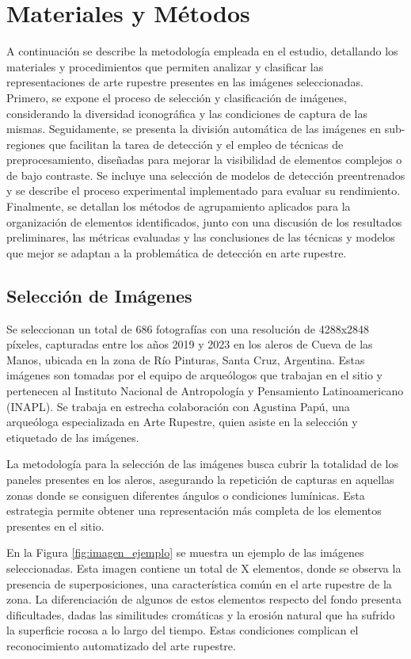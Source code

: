 \chapter{Materiales y Métodos}

A continuación se describe la metodología empleada en el estudio, detallando los materiales y procedimientos que permiten analizar y clasificar las representaciones de arte rupestre presentes en las imágenes seleccionadas.
Primero, se expone el proceso de selección y clasificación de imágenes, considerando la diversidad iconográfica y las condiciones de captura de las mismas.
Seguidamente, se presenta la división automática de las imágenes en sub-regiones que facilitan la tarea de detección y el empleo de técnicas de preprocesamiento, diseñadas para mejorar la visibilidad de elementos complejos o de bajo contraste.
Se incluye una selección de modelos de detección preentrenados y se describe el proceso experimental implementado para evaluar su rendimiento.
Finalmente, se detallan los métodos de agrupamiento aplicados para la organización de elementos identificados, junto con una discusión de los resultados preliminares, las métricas evaluadas y las conclusiones de las técnicas y modelos que mejor se adaptan a la problemática de detección en arte rupestre.

\section{Selección de Imágenes}
Se seleccionan un total de 686 fotografías con una resolución de 4288x2848 píxeles, capturadas entre los años 2019 y 2023 en los aleros de Cueva de las Manos, ubicada en la zona de Río Pinturas, Santa Cruz, Argentina.
Estas imágenes son tomadas por el equipo de arqueólogos que trabajan en el sitio y pertenecen al Instituto Nacional de Antropología y Pensamiento Latinoamericano (INAPL).
Se trabaja en estrecha colaboración con Agustina Papú, una arqueóloga especializada en Arte Rupestre, quien asiste en la selección y etiquetado de las imágenes.

La metodología para la selección de las imágenes busca cubrir la totalidad de los paneles presentes en los aleros, asegurando la repetición de capturas en aquellas zonas donde se consiguen diferentes ángulos o condiciones lumínicas.
Esta estrategia permite obtener una representación más completa de los elementos presentes en el sitio.

En la Figura \ref{fig:imagen_ejemplo} se muestra un ejemplo de las imágenes seleccionadas. Esta imagen contiene un total de X elementos, donde se observa la presencia de superposiciones, una característica común en el arte rupestre de la zona.
La diferenciación de algunos de estos elementos respecto del fondo presenta dificultades, dadas las similitudes cromáticas y la erosión natural que ha sufrido la superficie rocosa a lo largo del tiempo.
Estas condiciones complican el reconocimiento automatizado del arte rupestre.

